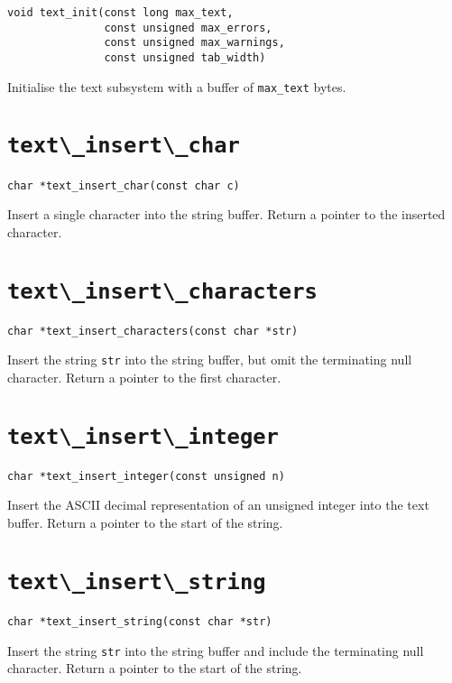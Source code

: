 \begin{verbatim}
void text_init(const long max_text, 
               const unsigned max_errors, 
               const unsigned max_warnings, 
               const unsigned tab_width)
\end{verbatim}
Initialise the text subsystem with a buffer of \verb+max_text+ bytes.

\section{\protect\verb+text\_insert\_char+}

\begin{verbatim}
char *text_insert_char(const char c)
\end{verbatim}
Insert a single character into the string buffer.
Return a pointer to the inserted character.

\section{\protect\verb+text\_insert\_characters+}
\begin{verbatim}
char *text_insert_characters(const char *str)
\end{verbatim}
Insert the string {\tt str} into the string buffer, but omit the
terminating null character.
Return a pointer to the first character.

\section{\protect\verb+text\_insert\_integer+}

\begin{verbatim}
char *text_insert_integer(const unsigned n)
\end{verbatim}
Insert the ASCII decimal representation of an unsigned integer into the text buffer.
Return a pointer to the start of the string.

\section{\protect\verb+text\_insert\_string+}

\begin{verbatim}
char *text_insert_string(const char *str)
\end{verbatim}
Insert the string {\tt str} into the string buffer and include the
terminating null character. 
Return a pointer to the start of the string.

